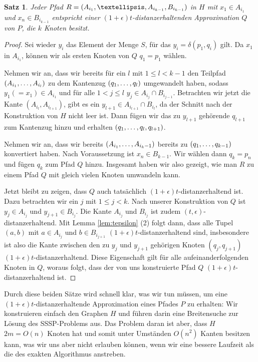 \documentclass[11pt]{article}
\newtheorem{theorem}{Satz}[section]
\begin{document}
	\begin{theorem}
		\label{theo:H2Approx}
		Jeder Pfad $R = (A_{i_1}, \textellipsis, A_{i_{k-1}}, B_{i_{k-1}})$ in $H$ mit $x_1 \in A_{i_1}$ und $x_n \in B_{i_{k-1}}$ entspricht einer $(1+\epsilon)t$-distanzerhaltenden Approximation $Q$ von $P$, die $k$ Knoten besitzt.
	\end{theorem}
	\begin{proof}
		Sei wieder $y_i$ das Element der Menge $S$, für das $y_i = \delta(p_1, q_i)$ gilt.
		Da $x_1$ in $A_{i_1}$, können wir als ersten Knoten von $Q$ $q_1 = p_1$ wählen.
		
		Nehmen wir an, dass wir bereits für ein $l$ mit $1 \leq l < k-1$ den Teilpfad $(A_{i_1}, \mathellipsis, A_{i_l})$ zu dem Kantenzug $(q_1, \mathellipsis, q_l)$ umgewandelt haben, sodass $y_1 (= x_1) \in A_{i_1}$ und für alle $1 < j \leq l$ $y_j \in A_{i_j} \cap B_{i_{j-1}}$. Betrachten wir jetzt die Kante $(A_{i_l}, A_{i_{l+1}})$, gibt es ein $y_{l+1} \in A_{i_{l+1}} \cap B_{i_l}$, da der Schnitt nach der Konstruktion von $H$ nicht leer ist. Dann fügen wir das zu $y_{l+1}$ gehörende $q_{l+1}$ zum Kantenzug hinzu und erhalten $(q_1, \mathellipsis, q_l, q_{l+1})$.
		
		Nehmen wir an, dass wir bereits $(A_{i_1}, \mathellipsis, A_{i_k-1})$ bereits zu $(q_1, \mathellipsis, q_{k-1})$ konvertiert haben. Nach Voraussetzung ist $x_n \in B_{k-1}$. Wir wählen dann $q_k = p_n$ und fügen $q_k$ zum Pfad $Q$ hinzu. 
		Insgesamt haben wir also gezeigt, wie man $R$ zu einem Pfad $Q$ mit gleich vielen Knoten umwandeln kann. 
		
		Jetzt bleibt zu zeigen, dass $Q$ auch tatsächlich $(1+\epsilon)t$-distanzerhaltend ist.
		Dazu betrachten wir ein $j$ mit $1 \leq j < k$. Nach unserer Konstruktion von $Q$ ist $y_j \in A_{i_j}$ und $y_{j+1} \in B_{i_j}$. Die Kante $A_{i_j}$ und $B_{i_j}$ ist zudem $(t, \epsilon)$-distanzerhaltend. Mit Lemma \ref{lem:tepsilon} (2) folgt dann, dass alle Tupel $(a, b)$ mit $a \in A_{i_j}$ und $b \in B_{i_{j+1}}$ $(1+\epsilon)t$-distanzerhaltend sind, insbesondere ist also die Kante zwischen den zu $y_j$ und $y_{j+1}$ gehörigen Knoten $(q_j, q_{j+1})$ $(1+\epsilon)t$-distanzerhaltend. Diese Eigenschaft gilt für alle aufeinanderfolgenden Knoten in $Q$, woraus folgt, dass der von uns konstruierte Pfad $Q$ $(1+\epsilon)t$-distanzerhaltend ist.
	\end{proof}
    
    Durch diese beiden Sätze wird schnell klar, was wir tun müssen, um eine $(1+\epsilon)t$-distanzerhaltende Approximation eines Pfades $P$ zu erhalten: Wir konstruieren einfach den Graphen $H$ und führen darin eine Breitensuche zur Lösung des SSSP-Problems aus. Das Problem daran ist aber, dass $H$ $2m = O(n)$ Knoten hat und somit unter Umständen $O(n^2)$ Kanten besitzen kann, was wir uns aber nicht erlauben können, wenn wir eine bessere Laufzeit als die des exakten Algorithmus anstreben.
    
\end{document}
